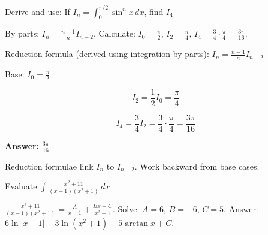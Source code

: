 \begin{problem}
Derive and use: If $I_n = \displaystyle \int_0^{\pi/2} \sin^n x \, dx$, find $I_4$
\end{problem}

\begin{hint}
By parts: $I_n = \frac{n-1}{n}I_{n-2}$. Calculate: $I_0 = \frac{\pi}{2}$, $I_2 = \frac{\pi}{4}$, $I_4 = \frac{3}{4} \cdot \frac{\pi}{4} = \frac{3\pi}{16}$.
\end{hint}

\begin{solution}
Reduction formula (derived using integration by parts): $I_n = \frac{n-1}{n}I_{n-2}$

Base: $I_0 = \frac{\pi}{2}$

\[
I_2 = \frac{1}{2}I_0 = \frac{\pi}{4}
\]

\[
I_4 = \frac{3}{4}I_2 = \frac{3}{4} \cdot \frac{\pi}{4} = \frac{3\pi}{16}
\]

\textbf{Answer:} $\boxed{\frac{3\pi}{16}}$
\end{solution}

\begin{takeaways}
Reduction formulae link $I_n$ to $I_{n-2}$. Work backward from base cases.
\end{takeaways}

\vspace{1cm}

\begin{problem}
Evaluate $\displaystyle \int \frac{x^2 + 11}{(x-1)(x^2 + 1)} \, dx$
\end{problem}

\begin{hint}
$\frac{x^2+11}{(x-1)(x^2+1)} = \frac{A}{x-1} + \frac{Bx+C}{x^2+1}$. Solve: $A=6$, $B=-6$, $C=5$. Answer: $6\ln|x-1| - 3\ln(x^2+1) + 5\arctan x + C$.
\end{hint}


